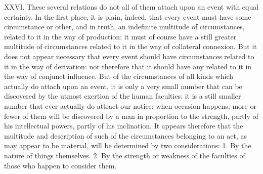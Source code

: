 \documentclass[12pt]{report}
\begin{document}
XXVI. These several relations do not all of them attach upon an event
with equal certainty. In the first place, it is plain, indeed, that
every event must have some circumstance or other, and in truth, an
indefinite multitude of circumstances, related to it in the way of
production: it must of course have a still greater multitude of
circumstances related to it in the way of collateral connexion. But it
does not appear necessary that every event should have circumstances
related to it in the way of derivation: nor therefore that it should
have any related to it in the way of conjunct influence. But of the
circumstances of all kinds which actually do attach upon an event, it is
only a very small number that can be discovered by the utmost exertion
of the human faculties: it is a still smaller number that ever actually
do attract our notice: when occasion happens, more or fewer of them will
be discovered by a man in proportion to the strength, partly of his
intellectual powers, partly of his inclination. It appears therefore
that the multitude and description of such of the circumstances
belonging to an act, as may appear to be material, will be determined by
two considerations: 1. By the nature of things themselves. 2. By the
strength or weakness of the faculties of those who happen to consider
them.
\end{document}
